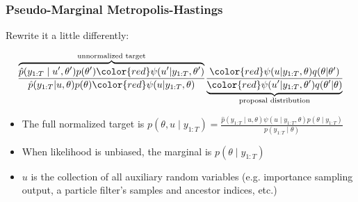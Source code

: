 \documentclass{beamer}
\begin{document}
\begin{frame}[fragile]
\frametitle{Pseudo-Marginal Metropolis-Hastings}


Rewrite it a little differently:

\begin{align*}
\frac{ \overbrace{ \hat{p}(y_{1:T} \mid u', \theta')p(\theta') \begingroup\color{red} \psi(u' | y_{1:T},\theta')\endgroup }^{\text{unnormalized target} }}{  \hat{p}(y_{1:T}| u, \theta) p(\theta)\begingroup\color{red}\psi(u|y_{1:T},\theta)\endgroup }
\frac{ \begingroup\color{red} \psi(u|y_{1:T},\theta)\endgroup q(\theta| \theta') }{ \underbrace{ \begingroup\color{red} \psi(u'|y_{1:T},\theta')\endgroup q(\theta'| \theta)}_{\text{proposal distribution} } }
\end{align*}




\begin{itemize}
\item The full normalized target is $p(\theta,u\mid y_{1:T}) =  \frac{\hat{p}(y_{1:T}\mid u, \theta)\psi(u \mid y_{1:T},\theta)p(\theta \mid y_{1:T}) }{p(y_{1:T}\mid \theta) }$
\item When likelihood is unbiased, the marginal is $p(\theta \mid y_{1:T})$
\item $u$ is the collection of all auxiliary random variables (e.g. importance sampling output, a particle filter's samples and ancestor indices, etc.)
\end{itemize}



\end{frame}
\end{document}
